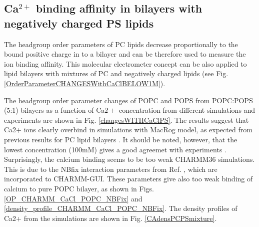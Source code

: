 \documentclass[aps,prl,superscriptaddress,twocolumn]{revtex4}
\begin{document}
\subsection{Ca$^{2+}$ binding affinity in bilayers with negatively charged PS lipids}

The headgroup order parameters of PC lipids
decrease proportionally to the bound positive
charge in to a bilayer \cite{seelig87,catte16} and can be
therefore used to measure the ion binding
affinity. This molecular electrometer concept can
be also applied to lipid bilayers with mixtures
of PC and negatively charged lipids \cite{borle85,macdonald87,roux90}
(see Fig. \ref{OrderParameterCHANGESWithCaClBELOW1M}).
%
%






The headgroup order parameter changes of POPC and POPS from POPC:POPS (5:1) bilayers
as a function of Ca$2+$ concentration from different
simulations and experiments \cite{roux90} are shown in Fig. \ref{changesWITHCaClPS}.
The results suggest that Ca2+ ions clearly overbind in simulations with
MacRog model, as expected from previous results for PC lipid bilayers \cite{catte16}.
It should be noted, however, that the lowest concentration (100mM) gives
a good agreemet with experiments .
Surprisingly, the calcium binding seems to be too weak CHARMM36 simulations.
This is due to the NBfix interaction parameters from Ref. , which are incorporated
to CHARMM-GUI. These parameters give also too weak binding of calcium to pure POPC bilayer,
as shown in Figs. \ref{OP_CHARMM_CaCl_POPC_NBFix} and \ref{density_profile_CHARMM_CaCl_POPC_NBFix}.
The density profiles of Ca2+ from the simulations are shown in Fig. \ref{CAdensPCPSmixture}.
\end{document}
